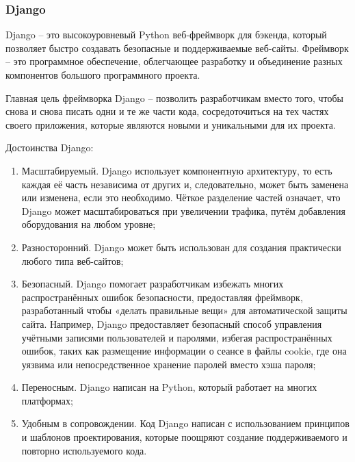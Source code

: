 \def\notedate{2022.10.24}
\def\currentauthor{Василян А.Р. (РК6-73Б)}

\subsubsection{Django}
	
Django -- это высокоуровневый Python веб-фреймворк для бэкенда, который позволяет быстро создавать безопасные и поддерживаемые веб-сайты. Фреймворк -- это программное обеспечение, облегчающее разработку и объединение разных компонентов большого программного проекта.
	
Главная цель фреймворка Django – позволить разработчикам вместо того, чтобы снова и снова писать одни и те же части кода, сосредоточиться на тех частях своего приложения, которые являются новыми и уникальными для их проекта.
	
Достоинства Django:
\begin{enumerate}
	\item Масштабируемый.  Django использует компонентную архитектуру, то есть каждая её часть независима от других и, следовательно, может быть заменена или изменена, если это необходимо. Чёткое разделение частей означает, что Django может масштабироваться при увеличении трафика, путём добавления оборудования на любом уровне;
	\item Разносторонний. Django может быть использован для создания практически любого типа веб-сайтов;
	\item Безопасный. Django помогает разработчикам избежать многих распространённых ошибок безопасности, предоставляя фреймворк, разработанный чтобы «делать правильные вещи» для автоматической защиты сайта. Например, Django предоставляет безопасный способ управления учётными записями пользователей и паролями, избегая распространённых ошибок, таких как размещение информации о сеансе в файлы cookie, где она уязвима или непосредственное хранение паролей вместо хэша пароля;
	\item Переносным. Django написан на Python, который работает на многих платформах;
	\item Удобным в сопровождении. Код Django написан с использованием принципов и шаблонов проектирования, которые поощряют создание поддерживаемого и повторно используемого кода.
\end{enumerate}

